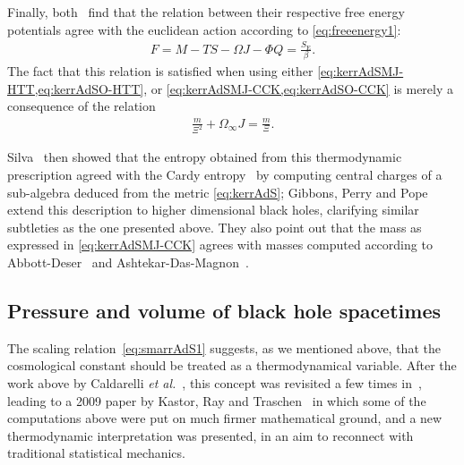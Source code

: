 \documentclass[
twoside,
openright,
frontopenright,
]{dmathesis}
\begin{document}
Finally, both~\cite{Hawking:1998kw,Caldarelli:1999xj} find that the relation
between their respective free energy potentials agree with the euclidean action
according to \cref{eq:freeenergy1}:
\begin{align}
  F = M- TS - \Omega J-\Phi Q = \frac{S_\mathrm{E}}{\beta}.
\end{align}
The fact that this relation is satisfied when using either
\cref{eq:kerrAdSMJ-HTT,eq:kerrAdSO-HTT}, or
\cref{eq:kerrAdSMJ-CCK,eq:kerrAdSO-CCK} is merely a consequence of the relation
\begin{align*}
  \frac{m}{\Xi^2}+\Omega_\infty J = \frac{m}{\Xi}.
\end{align*}

Silva~\cite{Silva:2002jq} then showed that the entropy obtained from this
thermodynamic prescription agreed with the Cardy
entropy~\cite{Cardy:1986ie,Bloete:1986qm} by computing central charges of a
sub-algebra deduced from the metric \cref{eq:kerrAdS}; Gibbons, Perry and
Pope~\cite{Gibbons:2004ai} extend this description to higher dimensional black
holes, clarifying similar subtleties as the one presented above. They also point
out that the mass as expressed in \cref{eq:kerrAdSMJ-CCK} agrees with masses
computed according to Abbott-Deser~\cite{Abbott:1981ff} and
Ashtekar-Das-Magnon~\cite{Ashtekar:1984zz,Ashtekar:1999jx}.

\subsection{Pressure and volume of black hole spacetimes}
\label{sec:press-volume-black}

The scaling relation~\eqref{eq:smarrAdS1} suggests, as we mentioned above, that
the cosmological constant should be treated as a thermodynamical variable. After
the work above by Caldarelli \emph{et al.}~\cite{Caldarelli:1999xj}, this
concept was revisited a few times
in~\cite{Wang:2006eb,Sekiwa:2006qj,Wang:2006bn,LarranagaRubio:2007fly}, leading
to a 2009 paper by Kastor, Ray and Traschen~\cite{Kastor:2009wy} in which some
of the computations above were put on much firmer mathematical ground, and a
new thermodynamic interpretation was presented, in an aim to reconnect with
traditional statistical mechanics.
\end{document}
